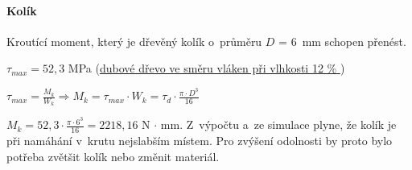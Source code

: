 \begin{minipage}{\textwidth}
\paragraph*{Kolík}    
Kroutící moment, který je dřevěný kolík o~průměru $D$ = 6~mm schopen přenést. %

$ \tau_{max} = 52,3 $ MPa (\href{https://is.mendelu.cz/eknihovna/opory/zobraz_cast.pl?fit_w=1;cast=9190}{dubové dřevo ve směru vláken při vlhkosti 12 \% } \parencite{pevnost})

$ \tau_{max} = \frac{M_k}{W_k} \Rightarrow M_k = \tau_{max} \cdot W_k = \tau _d \cdot \frac{\pi \cdot D^3}{16} $

$ M_k = 52,3 \cdot \frac{\pi \cdot 6^3}{16} = 2 218,16 $ N $\cdot$ mm. Z~výpočtu a~ze simulace plyne, že kolík je při namáhání v~krutu nejslabším místem. Pro zvýšení odolnosti by proto bylo 
potřeba zvětšit kolík nebo změnit materiál.
\end{minipage}